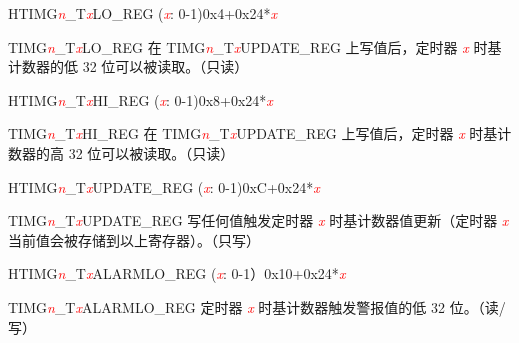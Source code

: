 \begin{register}{H}{TIMG\textcolor{red}{\it{n}}\_T\textcolor{red}{\it{x}}LO\_REG (\textcolor{red}{\it{x}}: 0-1)}{0x4+0x24*\textcolor{red}{\it{x}}}\label{regdesc:TIMERSTnLOREG}
%
\regnewline%
\begin{regdesc}\begin{reglist}
\item [TIMG\textcolor{red}{\it{n}}\_T\textcolor{red}{\it{x}}LO\_REG]在 TIMG\textcolor{red}{\it{n}}\_T\textcolor{red}{\it{x}}UPDATE\_REG 上写值后，定时器 \textcolor{red}{\it{x}} 时基计数器的低 32 位可以被读取。（只读）
\end{reglist}\end{regdesc}
\end{register}


\begin{register}{H}{TIMG\textcolor{red}{\it{n}}\_T\textcolor{red}{\it{x}}HI\_REG (\textcolor{red}{\it{x}}: 0-1)}{0x8+0x24*\textcolor{red}{\it{x}}}\label{regdesc:TIMERSTnHIREG}
%
\regnewline%
\begin{regdesc}\begin{reglist}
\item [TIMG\textcolor{red}{\it{n}}\_T\textcolor{red}{\it{x}}HI\_REG]在 TIMG\textcolor{red}{\it{n}}\_T\textcolor{red}{\it{x}}UPDATE\_REG 上写值后，定时器 \textcolor{red}{\it{x}}  时基计数器的高 32 位可以被读取。（只读）
\end{reglist}\end{regdesc}
\end{register}


\begin{register}{H}{TIMG\textcolor{red}{\it{n}}\_T\textcolor{red}{\it{x}}UPDATE\_REG (\textcolor{red}{\it{x}}: 0-1)}{0xC+0x24*\textcolor{red}{\it{x}}}\label{regdesc:TIMERSTnUPDATEREG}
%
\regnewline%
\begin{regdesc}\begin{reglist}
\item [TIMG\textcolor{red}{\it{n}}\_T\textcolor{red}{\it{x}}UPDATE\_REG]写任何值触发定时器 \textcolor{red}{\it{x}} 时基计数器值更新（定时器 \textcolor{red}{\it{x}} 当前值会被存储到以上寄存器）。（只写）
\end{reglist}\end{regdesc}
\end{register}


\begin{register}{H}{TIMG\textcolor{red}{\it{n}}\_T\textcolor{red}{\it{x}}ALARMLO\_REG (\textcolor{red}{\it{x}}: 0-1）}{0x10+0x24*\textcolor{red}{\it{x}}}\label{regdesc:TIMERSTnALARMLOREG}
%
\regnewline%
\begin{regdesc}\begin{reglist}
\item [TIMG\textcolor{red}{\it{n}}\_T\textcolor{red}{\it{x}}ALARMLO\_REG]定时器 \textcolor{red}{\it{x}} 时基计数器触发警报值的低 32 位。（读/写）
\end{reglist}\end{regdesc}
\end{register}


